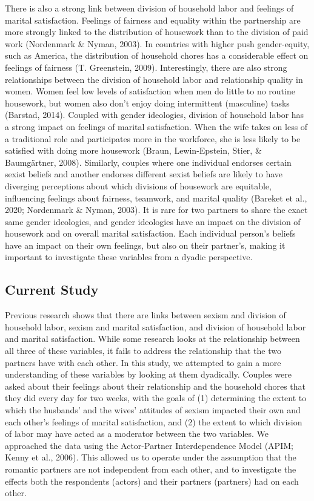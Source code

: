 \documentclass[
  man]{apa6}
\begin{document}
There is also a strong link between division of household labor and feelings of marital satisfaction. Feelings of fairness and equality within the partnership are more strongly linked to the distribution of housework than to the division of paid work (Nordenmark \& Nyman, 2003). In countries with higher push gender-equity, such as America, the distribution of household chores has a considerable effect on feelings of fairness (T. Greenstein, 2009). Interestingly, there are also strong relationships between the division of household labor and relationship quality in women. Women feel low levels of satisfaction when men do little to no routine housework, but women also don't enjoy doing intermittent (masculine) tasks (Barstad, 2014). Coupled with gender ideologies, division of household labor has a strong impact on feelings of marital satisfaction. When the wife takes on less of a traditional role and participates more in the workforce, she is less likely to be satisfied with doing more housework (Braun, Lewin-Epstein, Stier, \& Baumgärtner, 2008). Similarly, couples where one individual endorses certain sexist beliefs and another endorses different sexist beliefs are likely to have diverging perceptions about which divisions of housework are equitable, influencing feelings about fairness, teamwork, and marital quality (Bareket et al., 2020; Nordenmark \& Nyman, 2003). It is rare for two partners to share the exact same gender ideologies, and gender ideologies have an impact on the division of housework and on overall marital satisfaction. Each individual person's beliefs have an impact on their own feelings, but also on their partner's, making it important to investigate these variables from a dyadic perspective.

\hypertarget{current-study}{%
\subsection{Current Study}\label{current-study}}

Previous research shows that there are links between sexism and division of household labor, sexism and marital satisfaction, and division of household labor and marital satisfaction. While some research looks at the relationship between all three of these variables, it fails to address the relationship that the two partners have with each other. In this study, we attempted to gain a more understanding of these variables by looking at them dyadically. Couples were asked about their feelings about their relationship and the household chores that they did every day for two weeks, with the goals of (1) determining the extent to which the husbands' and the wives' attitudes of sexism impacted their own and each other's feelings of marital satisfaction, and (2) the extent to which division of labor may have acted as a moderator between the two variables. We approached the data using the Actor-Partner Interdependence Model (APIM; Kenny et al., 2006). This allowed us to operate under the assumption that the romantic partners are not independent from each other, and to investigate the effects both the respondents (actors) and their partners (partners) had on each other.
\end{document}
